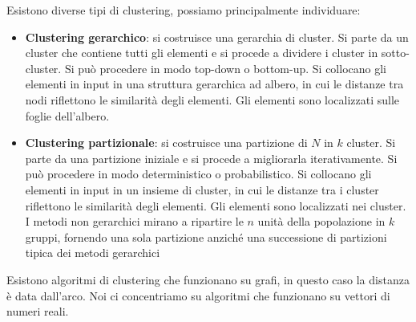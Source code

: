 Esistono diverse tipi di clustering, possiamo principalmente individuare:
\begin{itemize}
    \item \textbf{Clustering gerarchico}: si costruisce una gerarchia di cluster.
          Si parte da un cluster che contiene tutti gli elementi e si procede a dividere
          i cluster in sotto-cluster. Si può procedere in modo top-down o bottom-up. Si
          collocano gli elementi in input in una struttura gerarchica ad albero, in cui
          le distanze tra nodi riflettono le similarità degli elementi. Gli
          elementi sono localizzati sulle foglie dell'albero.
    \item \textbf{Clustering partizionale}: si costruisce una partizione di $N$
          in $k$ cluster. Si parte da una partizione iniziale e si procede a migliorarla
          iterativamente. Si può procedere in modo deterministico o probabilistico.
          Si collocano gli elementi in input in un insieme di cluster, in cui le
          distanze tra i cluster riflettono le similarità degli elementi. Gli elementi
          sono localizzati nei cluster. I metodi non gerarchici mirano a ripartire le
          $n$ unità della popolazione in $k$ gruppi, fornendo una sola partizione anziché
          una successione di partizioni tipica dei metodi gerarchici
\end{itemize}
Esistono algoritmi di clustering che funzionano su grafi, in questo caso la distanza
è data dall'arco. Noi ci concentriamo su algoritmi che funzionano su vettori di
numeri reali.
